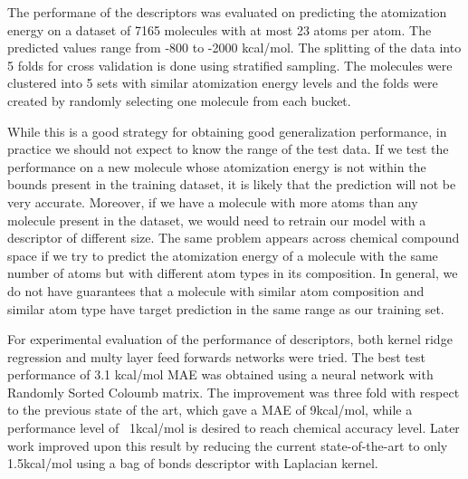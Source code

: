 \documentclass[10pt,journal,a4paper]{IEEEtran}
\begin{document}
The performane of the descriptors was evaluated on predicting the atomization energy on a dataset of 7165 molecules with at most 23 atoms per atom. The predicted values range from -800 to -2000 kcal/mol. The splitting of the data into 5 folds for cross validation is done using stratified sampling. The molecules were clustered into 5 sets with similar atomization energy levels and the folds were created by randomly selecting one molecule from each bucket.

While this is a good strategy for obtaining good generalization performance, in practice we should not expect to know the range of the test data. If we test the performance on a new molecule whose atomization energy is not within the bounds present in the training dataset, it is likely that the prediction will not be very accurate. Moreover, if we have a molecule with more atoms than any molecule present in the dataset, we would need to retrain our model with a  descriptor of different size. The same problem appears across chemical compound space if we try to predict the atomization energy of a molecule with the same number of atoms but with different atom types in its composition. In general, we do not have guarantees that a molecule with similar atom composition and similar atom type have target prediction in the same range as our training set.

For experimental evaluation of the performance of descriptors, both kernel ridge regression and multy layer feed forwards networks were tried. The best test performance of 3.1 kcal/mol MAE was obtained using a neural network with
 Randomly Sorted Coloumb matrix. The improvement was three fold with respect to the previous state of the art, which gave a MAE of 9kcal/mol, while a performance level of ~1kcal/mol is desired to reach chemical accuracy level.
Later work \cite{bob} improved upon this result by reducing the current state-of-the-art to only 1.5kcal/mol using a bag of bonds descriptor with Laplacian kernel.
\end{document}
